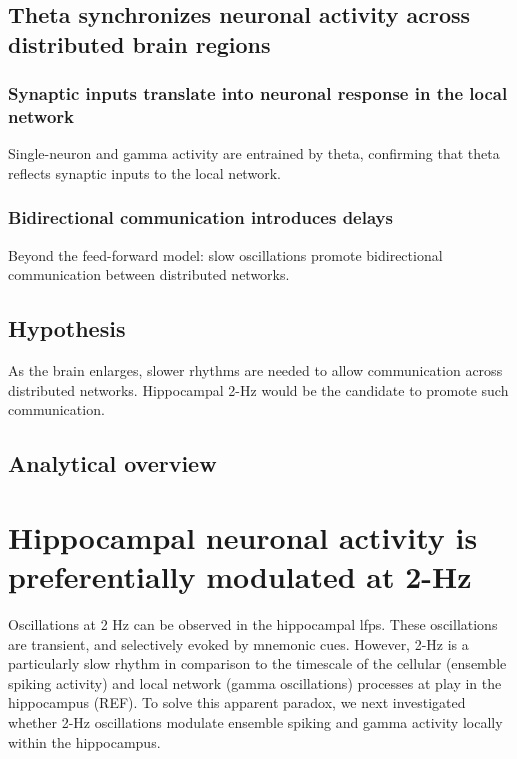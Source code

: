 \documentclass[12pt,a4paper]{report}
\newcommand{\gp}[1]{\glspl{#1}}  %
\begin{document}
\subsection{Theta synchronizes neuronal activity across distributed brain regions}
\subsubsection{Synaptic inputs translate into neuronal response in the local network}
Single-neuron and gamma activity are entrained by theta, confirming that theta reflects synaptic inputs to the local network.

\subsubsection{Bidirectional communication introduces delays}
Beyond the feed-forward model: slow oscillations promote bidirectional communication between distributed networks.

\subsection{Hypothesis}
As the brain enlarges, slower rhythms are needed to allow communication across distributed networks. Hippocampal 2-Hz would be the candidate to promote such communication. 

\subsection{Analytical overview}



\section{Hippocampal neuronal activity is preferentially modulated at 2-Hz}
Oscillations at 2 Hz can be observed in the hippocampal \gp{lfp}. These oscillations are transient, and selectively evoked by mnemonic cues. However, 2-Hz is a particularly slow rhythm in comparison to the timescale of the cellular (ensemble spiking activity) and local network (gamma oscillations) processes at play in the hippocampus (REF). To solve this apparent paradox, we next investigated whether 2-Hz oscillations modulate ensemble spiking and gamma activity locally within the hippocampus.

\end{document}
